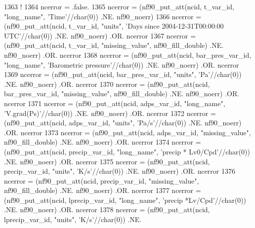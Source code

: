 \begin{DoxyCode}
1363     \textcolor{comment}{!}
1364     ncerror = .false.
1365     ncerror = (nf90\_put\_att(ncid, t\_var\_id, \textcolor{stringliteral}{"long\_name"}, \textcolor{stringliteral}{'Time'}//char(0))                           .NE. 
      nf90\_noerr)
1366     ncerror = (nf90\_put\_att(ncid, t\_var\_id, \textcolor{stringliteral}{"units"}, \textcolor{stringliteral}{'Days since 2004-12-31T00:00:00 UTC'}//char(0)) .NE. 
      nf90\_noerr) .OR. ncerror
1367     ncerror = (nf90\_put\_att(ncid, t\_var\_id, \textcolor{stringliteral}{"missing\_value"}, nf90\_fill\_double)                      .NE. 
      nf90\_noerr) .OR. ncerror
1368     ncerror = (nf90\_put\_att(ncid, bar\_pres\_var\_id, \textcolor{stringliteral}{"long\_name"}, \textcolor{stringliteral}{'Barometric pressure'}//char(0))     .NE. 
      nf90\_noerr) .OR. ncerror
1369     ncerror = (nf90\_put\_att(ncid, bar\_pres\_var\_id, \textcolor{stringliteral}{"units"}, \textcolor{stringliteral}{'Pa'}//char(0))                          .NE. 
      nf90\_noerr) .OR. ncerror
1370     ncerror = (nf90\_put\_att(ncid, bar\_pres\_var\_id, \textcolor{stringliteral}{"missing\_value"}, nf90\_fill\_double)               .NE. 
      nf90\_noerr) .OR. ncerror
1371     ncerror = (nf90\_put\_att(ncid, adps\_var\_id, \textcolor{stringliteral}{"long\_name"}, \textcolor{stringliteral}{'V.grad(Ps)'}//char(0))                  .NE. 
      nf90\_noerr) .OR. ncerror
1372     ncerror = (nf90\_put\_att(ncid, adps\_var\_id, \textcolor{stringliteral}{"units"}, \textcolor{stringliteral}{'Pa/s'}//char(0))                            .NE. 
      nf90\_noerr) .OR. ncerror
1373     ncerror = (nf90\_put\_att(ncid, adps\_var\_id, \textcolor{stringliteral}{"missing\_value"}, nf90\_fill\_double)                   .NE. 
      nf90\_noerr) .OR. ncerror
1374     ncerror = (nf90\_put\_att(ncid, precip\_var\_id, \textcolor{stringliteral}{"long\_name"}, \textcolor{stringliteral}{'precip * Lv0/Cpd'}//char(0))          .NE. 
      nf90\_noerr) .OR. ncerror
1375     ncerror = (nf90\_put\_att(ncid, precip\_var\_id, \textcolor{stringliteral}{"units"}, \textcolor{stringliteral}{'K/s'}//char(0))                           .NE. 
      nf90\_noerr) .OR. ncerror
1376     ncerror = (nf90\_put\_att(ncid, precip\_var\_id, \textcolor{stringliteral}{"missing\_value"}, nf90\_fill\_double)                 .NE. 
      nf90\_noerr) .OR. ncerror
1377     ncerror = (nf90\_put\_att(ncid, lprecip\_var\_id, \textcolor{stringliteral}{"long\_name"}, \textcolor{stringliteral}{'precip *Lv/Cpd'}//char(0))           .NE. 
      nf90\_noerr) .OR. ncerror
1378     ncerror = (nf90\_put\_att(ncid, lprecip\_var\_id, \textcolor{stringliteral}{"units"}, \textcolor{stringliteral}{'K/s'}//char(0))                          .NE. 

\end{DoxyCode}
